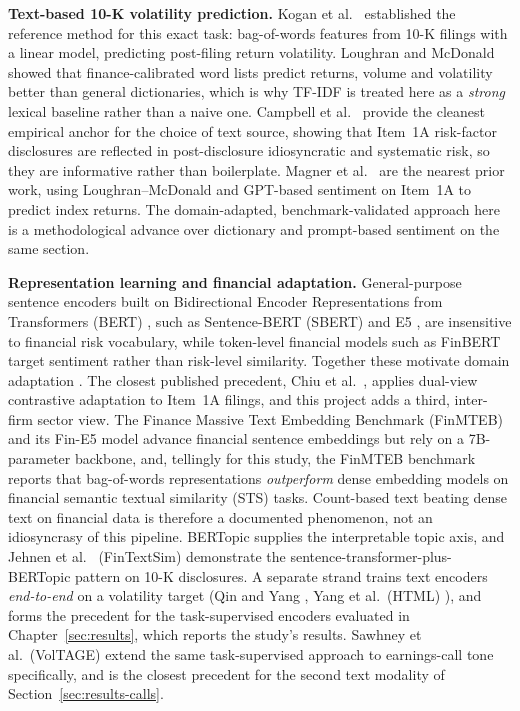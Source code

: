 \documentclass[logo,msc,ai]{infthesis}        %
\begin{document}
\textbf{Text-based 10-K volatility prediction.} Kogan et al.\ \cite{kogan2009predicting} established the reference method for this exact task: bag-of-words features from 10-K filings with a linear model, predicting post-filing return volatility. Loughran and McDonald~\cite{loughran2011liability} showed that finance-calibrated word lists predict returns, volume and volatility better than general dictionaries, which is why TF-IDF is treated here as a \emph{strong} lexical baseline rather than a naive one. Campbell et al.\ \cite{campbell2014information} provide the cleanest empirical anchor for the choice of text source, showing that Item~1A risk-factor disclosures are reflected in post-disclosure idiosyncratic and systematic risk, so they are informative rather than boilerplate. Magner et al.\ \cite{magner2025decoding} are the nearest prior work, using Loughran--McDonald and GPT-based sentiment on Item~1A to predict index returns. The domain-adapted, benchmark-validated approach here is a methodological advance over dictionary and prompt-based sentiment on the same section.

\textbf{Representation learning and financial adaptation.} General-purpose sentence encoders built on Bidirectional Encoder Representations from Transformers (BERT) \cite{devlin2019bert}, such as Sentence-BERT (SBERT) \cite{reimers2019sentence} and E5 \cite{wang2022text}, are insensitive to financial risk vocabulary, while token-level financial models such as FinBERT \cite{yang2020finbert} target sentiment rather than risk-level similarity. Together these motivate domain adaptation \cite{gururangan2020don}. The closest published precedent, Chiu et al.\ \cite{chiu2025financial}, applies dual-view contrastive adaptation to Item~1A filings, and this project adds a third, inter-firm sector view. The Finance Massive Text Embedding Benchmark (FinMTEB) and its Fin-E5 model \cite{tang-yang-2025-finmteb} advance financial sentence embeddings but rely on a 7B-parameter backbone, and, tellingly for this study, the FinMTEB benchmark reports that bag-of-words representations \emph{outperform} dense embedding models on financial semantic textual similarity (STS) tasks. Count-based text beating dense text on financial data is therefore a documented phenomenon, not an idiosyncrasy of this pipeline. BERTopic \cite{grootendorst2022bertopic} supplies the interpretable topic axis, and Jehnen et al.\ \cite{jehnen2026fintextsim} (FinTextSim) demonstrate the sentence-transformer-plus-BERTopic pattern on 10-K disclosures. A separate strand trains text encoders \emph{end-to-end} on a volatility target (Qin and Yang \cite{qin2019you}, Yang et al.\ (HTML) \cite{yang2020html}), and forms the precedent for the task-supervised encoders evaluated in Chapter~\ref{sec:results}, which reports the study's results. Sawhney et al.\ (VolTAGE) \cite{sawhney2020voltage} extend the same task-supervised approach to earnings-call tone specifically, and is the closest precedent for the second text modality of Section~\ref{sec:results-calls}.
\end{document}
